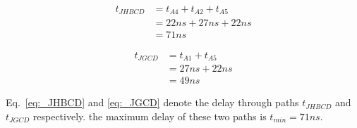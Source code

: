 \begin{equation}\label{eq:_JHBCD}
    \begin{split}
    t_{JHBCD} &=  t_{A4} + t_{A2} + t_{A5}\\
    &= 22ns + 27ns + 22ns\\
    &= 71ns
    \end{split}
\end{equation}


\begin{equation}\label{eq:_JGCD}
    \begin{split}
    t_{JGCD} &=  t_{A1} + t_{A5}\\
    &= 27ns + 22ns\\
    &= 49ns
    \end{split}
\end{equation}

Eq.~\ref{eq:_JHBCD} and \ref{eq:_JGCD} denote the delay through paths $t_{JHBCD}$ and $t_{JGCD}$ respectively. the maximum delay of these two paths is $t_{min} = 71ns$.